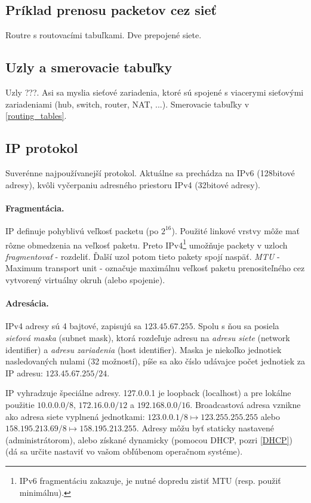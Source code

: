 \documentclass[10pt,a4paper]{article}
\begin{document}
\subsection{Príklad prenosu packetov cez sieť} 

Routre s routovacími tabuľkami. Dve prepojené siete. 

\subsection{Uzly a smerovacie tabuľky}     
Uzly ???. Asi sa myslia sieťové zariadenia, ktoré sú spojené s viacerymi sieťovými zariadeniami (hub, switch, router, NAT, ...). 
Smerovacie tabuľky v \ref{routing_tables}. 

\subsection{IP protokol}    
Suverénne najpoužívanejší protokol. Aktuálne sa prechádza na IPv6 (128bitové adresy), kvôli vyčerpaniu adresného priestoru IPv4 (32bitové adresy). 

\paragraph{Fragmentácia.}
IP definuje pohyblivú veľkosť packetu (po $2^16$). Použité linkové vrstvy môže mať rôzne obmedzenia na veľkosť paketu. Preto IPv4\footnote{
IPv6 fragmentáciu zakazuje, je nutné dopredu zistiť MTU (resp. použiť minimálnu). 
} umožňuje packety v uzloch \emph{fragmentovať} - rozdeliť. Ďalší uzol potom tieto pakety spojí naspäť. \emph{MTU} - Maximum transport unit - označuje maximálnu veľkosť paketu prenositeľného cez vytvorený virtuálny okruh (alebo spojenie). 

\paragraph{Adresácia.}
IPv4 adresy sú 4 bajtové, zapisujú sa $123.45.67.255$. Spolu s ňou sa posiela \emph{sieťová maska} (subnet mask), ktorá rozdeľuje adresu na \emph{adresu siete} (network identifier) a \emph{adresu zariadenia} (host identifier). Maska je niekoľko jednotiek nasledovaných nulami (32 možností), píše sa ako číslo udávajce počet jednotiek za IP adresu: $123.45.67.255/24$. 

IP vyhradzuje špeciálne adresy. 127.0.0.1 je loopback (localhost) a pre lokálne použitie $10.0.0.0/8$, $172.16.0.0/12$ a $192.168.0.0/16$. Broadcastová adresa vznikne ako adresa siete vyplnená jednotkami: $123.0.0.1/8 \mapsto 123.255.255.255$ alebo 
$158.195.213.69/8 \mapsto 158.195.213.255$.
Adresy môžu byť staticky nastavené (administrátorom), alebo získané dynamicky (pomocou DHCP, pozri \ref{DHCP}) (dá sa určite nastaviť vo vašom obľúbenom operačnom systéme). 
\end{document}
